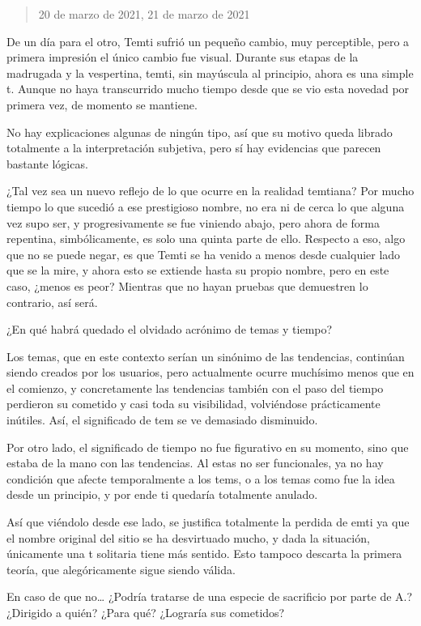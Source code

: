 \documentclass[
  spanish,
]{book}
\begin{document}
\begin{quote}
20 de marzo de 2021, 21 de marzo de 2021
\end{quote}

De un día para el otro, Temti sufrió un pequeño cambio, muy perceptible, pero a primera impresión el único cambio fue visual. Durante sus etapas de la madrugada y la vespertina, temti, sin mayúscula al principio, ahora es una simple t. Aunque no haya transcurrido mucho tiempo desde que se vio esta novedad por primera vez, de momento se mantiene.

No hay explicaciones algunas de ningún tipo, así que su motivo queda librado totalmente a la interpretación subjetiva, pero sí hay evidencias que parecen bastante lógicas.

¿Tal vez sea un nuevo reflejo de lo que ocurre en la realidad temtiana? Por mucho tiempo lo que sucedió a ese prestigioso nombre, no era ni de cerca lo que alguna vez supo ser, y progresivamente se fue viniendo abajo, pero ahora de forma repentina, simbólicamente, es solo una quinta parte de ello. Respecto a eso, algo que no se puede negar, es que Temti se ha venido a menos desde cualquier lado que se la mire, y ahora esto se extiende hasta su propio nombre, pero en este caso, ¿menos es peor? Mientras que no hayan pruebas que demuestren lo contrario, así será.

¿En qué habrá quedado el olvidado acrónimo de temas y tiempo?

Los temas, que en este contexto serían un sinónimo de las tendencias, continúan siendo creados por los usuarios, pero actualmente ocurre muchísimo menos que en el comienzo, y concretamente las tendencias también con el paso del tiempo perdieron su cometido y casi toda su visibilidad, volviéndose prácticamente inútiles. Así, el significado de tem se ve demasiado disminuido.

Por otro lado, el significado de tiempo no fue figurativo en su momento, sino que estaba de la mano con las tendencias. Al estas no ser funcionales, ya no hay condición que afecte temporalmente a los tems, o a los temas como fue la idea desde un principio, y por ende ti quedaría totalmente anulado.

Así que viéndolo desde ese lado, se justifica totalmente la perdida de emti ya que el nombre original del sitio se ha desvirtuado mucho, y dada la situación, únicamente una t solitaria tiene más sentido. Esto tampoco descarta la primera teoría, que alegóricamente sigue siendo válida.

En caso de que no\ldots{} ¿Podría tratarse de una especie de sacrificio por parte de A.? ¿Dirigido a quién? ¿Para qué? ¿Lograría sus cometidos?
\end{document}
